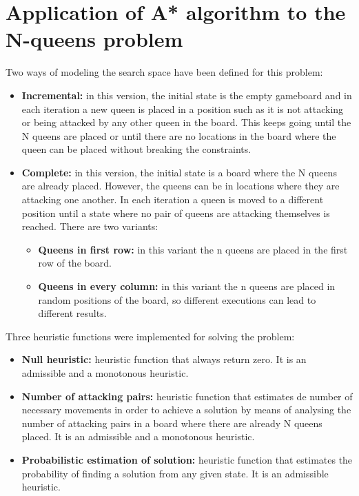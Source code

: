 \documentclass[11pt]{llncs}
\begin{document}
\section{Application of A* algorithm to the N-queens problem}\label{astar_nqueens}
Two ways of modeling the search space have been defined for this problem:
\begin{itemize}
    \item \textbf{Incremental:} in this version, the initial state is the empty gameboard and in each iteration a new queen is placed in a position such as it is not attacking or being attacked by any other queen in the board. This keeps going until the N queens are placed or until there are no locations in the board where the queen can be placed without breaking the constraints.
    \item \textbf{Complete:} in this version, the initial state is a board where the N queens are already placed. However, the queens can be in locations where they are attacking one another. In each iteration a queen is moved to a different position until a state where no pair of queens are attacking themselves is reached. There are two variants:
    \begin{itemize}
        \item \textbf{Queens in first row:} in this variant the n queens are placed in the first row of the board.
        \item \textbf{Queens in every column:} in this variant the n queens are placed in random positions of the board, so different executions can lead to different results.
    \end{itemize}
\end{itemize}
Three heuristic functions were implemented for solving the problem:
\begin{itemize}
    \item \textbf{Null heuristic:} heuristic function that always return zero. It is an admissible and a monotonous heuristic.  
    \item \textbf{Number of attacking pairs:} heuristic function that estimates de number of necessary movements in order to achieve a solution by means of analysing the number of attacking pairs in a board where there are already N queens placed. It is an admissible and a monotonous heuristic.
    \item \textbf{Probabilistic estimation of solution:} heuristic function that estimates the probability of finding a solution from any given state. It is an admissible heuristic. 
\end{itemize}
\end{document}
